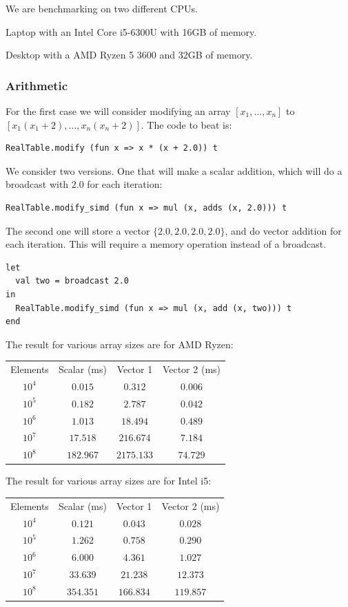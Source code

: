 \documentclass{article}
\begin{document}
We are benchmarking on two different CPUs.

Laptop with an Intel Core i5-6300U with 16GB of memory.

Desktop with a AMD Ryzen 5 3600 and 32GB of memory.

\subsubsection{Arithmetic}

For the first case we will consider modifying an array $[x_1, \ldots, x_n]$ to $[x_1(x_1 + 2), \ldots, x_n(x_n + 2)]$. The code to beat is:
\begin{lstlisting}
RealTable.modify (fun x => x * (x + 2.0)) t
\end{lstlisting}

We consider two versions. One that will make a scalar addition, which will do a broadcast with $2.0$ for each iteration:
\begin{lstlisting}
RealTable.modify_simd (fun x => mul (x, adds (x, 2.0))) t
\end{lstlisting}
The second one will store a vector $\{ 2.0, 2.0, 2.0, 2.0 \}$, and do vector addition for each iteration. This will require a memory operation instead of a broadcast.
\begin{lstlisting}
let
  val two = broadcast 2.0
in
  RealTable.modify_simd (fun x => mul (x, add (x, two))) t
end
\end{lstlisting}
The result for various array sizes are for AMD Ryzen:
\begin{center}
\begin{tabular}{ c c c c }
    Elements & Scalar (ms) & Vector 1 & Vector 2 (ms) \\
    $10^4$ & $0.015$ & $0.312$ & $0.006$ \\
    $10^5$ & $0.182$ & $2.787$ & $0.042$ \\
    $10^6$ & $1.013$ & $18.494$ & $0.489$ \\
    $10^7$ & $17.518$ & $216.674$ & $7.184$ \\
    $10^8$ & $182.967$ & $2175.133$ & $74.729$ \\
\end{tabular}
\end{center}

The result for various array sizes are for Intel i5:
\begin{center}
\begin{tabular}{ c c c c }
    Elements & Scalar (ms) & Vector 1 & Vector 2 (ms) \\
    $10^4$ & $0.121$ & $0.043$ & $0.028$ \\
    $10^5$ & $1.262$ & $0.758$ & $0.290$ \\
    $10^6$ & $6.000$ & $4.361$ & $1.027$ \\
    $10^7$ & $33.639$ & $21.238$ & $12.373$ \\
    $10^8$ & $354.351$ & $166.834$ & $119.857$ \\
\end{tabular}
\end{center}
\end{document}
